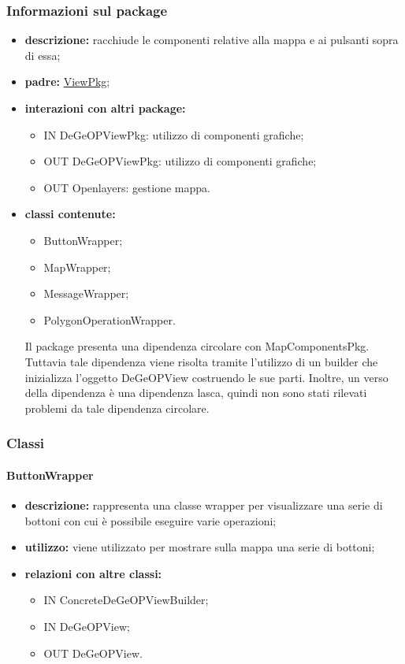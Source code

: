 \subsubsection{Informazioni sul package}
\begin{itemize}
	\item \textbf{descrizione:} racchiude le componenti relative alla mappa e ai pulsanti sopra di essa;
	\item \textbf{padre:} \hyperref[pkg::ViewPkg]{ViewPkg};
	\item \textbf{interazioni con altri package:} 
	\begin{itemize}
		\item IN DeGeOPViewPkg: utilizzo di componenti grafiche;
		\item OUT DeGeOPViewPkg: utilizzo di componenti grafiche;
		\item OUT Openlayers: gestione mappa.
	\end{itemize}
	\item \textbf{classi contenute:}
	\begin{itemize}
		\item ButtonWrapper;
		\item MapWrapper;
		\item MessageWrapper;
		\item PolygonOperationWrapper.
	\end{itemize}
	Il package presenta una dipendenza circolare con MapComponentsPkg. Tuttavia tale dipendenza viene risolta tramite l'utilizzo di un builder che inizializza l'oggetto DeGeOPView costruendo le sue parti. Inoltre, un verso della dipendenza è una dipendenza lasca, quindi non sono stati rilevati problemi da tale dipendenza circolare.
\end{itemize}
\subsubsection{Classi}
\paragraph{ButtonWrapper}
\begin{itemize}
	\item \textbf{descrizione:} rappresenta una classe wrapper per visualizzare una serie di bottoni con cui è possibile eseguire varie operazioni;
	\item \textbf{utilizzo:} viene utilizzato per mostrare sulla mappa una serie di bottoni;
	\item \textbf{relazioni con altre classi:} 
	\begin{itemize}
		\item IN ConcreteDeGeOPViewBuilder;
		\item IN DeGeOPView;
		\item OUT DeGeOPView.
	\end{itemize}
\end{itemize}
